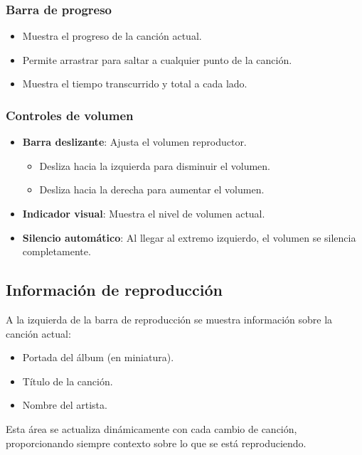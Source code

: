 \documentclass[11pt, a4paper]{article}
\begin{document}
    \subsubsection{Barra de progreso}

    \begin{itemize}
      \item Muestra el progreso de la canción actual.
      \item Permite arrastrar para saltar a cualquier punto de la canción.
      \item Muestra el tiempo transcurrido y total a cada lado.
    \end{itemize}

    \subsubsection{Controles de volumen}

    \begin{itemize}
      \item \textbf{Barra deslizante}: Ajusta el volumen reproductor.
        \begin{itemize}
          \item Desliza hacia la izquierda para disminuir el volumen.
          \item Desliza hacia la derecha para aumentar el volumen.
        \end{itemize}
      \item \textbf{Indicador visual}: Muestra el nivel de volumen actual.
      \item \textbf{Silencio automático}: Al llegar al extremo izquierdo, el volumen se silencia completamente.
    \end{itemize}

  \subsection{Información de reproducción}

  A la izquierda de la barra de reproducción se muestra información sobre la canción actual:

  \begin{itemize}
    \item Portada del álbum (en miniatura).
    \item Título de la canción.
    \item Nombre del artista.
  \end{itemize}

  Esta área se actualiza dinámicamente con cada cambio de canción, proporcionando siempre contexto sobre lo que se está reproduciendo.
\end{document}
